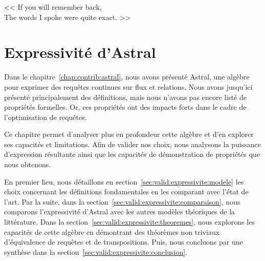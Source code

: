 \begin{savequote}[6cm]
<< If you will remember back,\\ The words I spoke were quite exact. >>
\end{savequote}

\chapter{Expressivité d'Astral}\label{chap:validation:expressivite}
\chaptertoc

Dans le chapitre~\ref{chap:contrib:astral}, nous avons présenté Astral, une algèbre pour exprimer des requêtes continues sur flux et relations. Nous avons jusqu'ici présenté principalement des définitions, mais nous n'avons pas encore listé de propriétés formelles. Or, ces propriétés ont des impacts forts dans le cadre de l'optimisation de requêtes.

Ce chapitre permet d'analyser plus en profondeur cette algèbre et d'en explorer ses capacités et limitations. Afin de valider nos choix, nous analysons la puissance d'expression résultante ainsi que les capacités de démonstration de propriétés que nous obtenons.

En premier lieu, nous détaillons en section~\ref{sec:valid:expressivite:modele} les choix concernant les définitions fondamentales en les comparant avec l'état de l'art. Par la suite, dans la section~\ref{sec:valid:expressivite:comparaison}, nous comparons l'expressivité d'Astral avec les autres modèles théoriques de la littérature. Dans la section~\ref{sec:valid:expressivite:theoremes}, nous explorons les capacités de cette algèbre en démontrant des théorèmes non triviaux d'équivalence de requêtes et de transpositions. Puis, nous concluons par une synthèse dans la section~\ref{sec:valid:expressivite:conclusion}.




